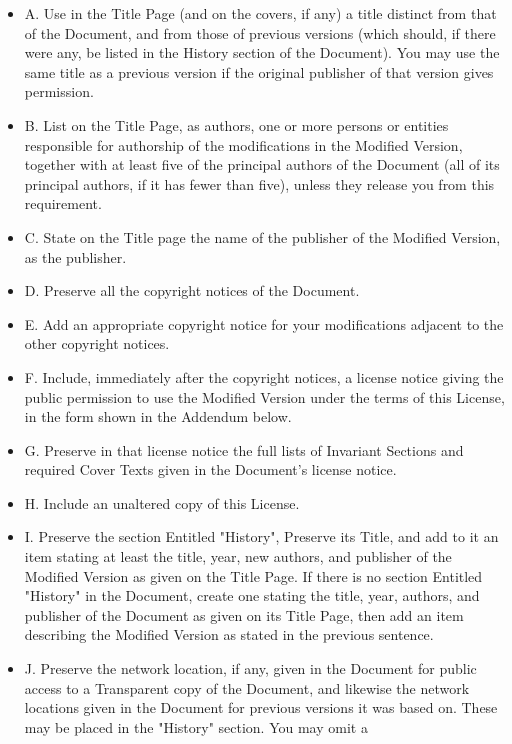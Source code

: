 \begin{itemize}
\tightlist
\item
  A. Use in the Title Page (and on the covers, if any) a title distinct
  from that of the Document, and from those of previous versions (which
  should, if there were any, be listed in the History section of the
  Document). You may use the same title as a previous version if the
  original publisher of that version gives permission.
\item
  B. List on the Title Page, as authors, one or more persons or entities
  responsible for authorship of the modifications in the Modified
  Version, together with at least five of the principal authors of the
  Document (all of its principal authors, if it has fewer than five),
  unless they release you from this requirement.
\item
  C. State on the Title page the name of the publisher of the Modified
  Version, as the publisher.
\item
  D. Preserve all the copyright notices of the Document.
\item
  E. Add an appropriate copyright notice for your modifications adjacent
  to the other copyright notices.
\item
  F. Include, immediately after the copyright notices, a license notice
  giving the public permission to use the Modified Version under the
  terms of this License, in the form shown in the Addendum below.
\item
  G. Preserve in that license notice the full lists of Invariant
  Sections and required Cover Texts given in the Document's license
  notice.
\item
  H. Include an unaltered copy of this License.
\item
  I. Preserve the section Entitled "History", Preserve its Title, and
  add to it an item stating at least the title, year, new authors, and
  publisher of the Modified Version as given on the Title Page. If there
  is no section Entitled "History" in the Document, create one stating
  the title, year, authors, and publisher of the Document as given on
  its Title Page, then add an item describing the Modified Version as
  stated in the previous sentence.
\item
  J. Preserve the network location, if any, given in the Document for
  public access to a Transparent copy of the Document, and likewise the
  network locations given in the Document for previous versions it was
  based on. These may be placed in the "History" section. You may omit a

\end{itemize}
